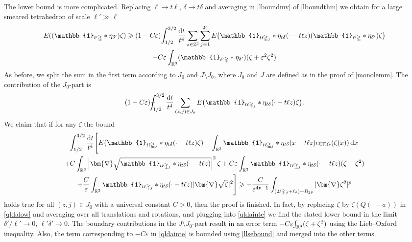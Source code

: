 \documentclass[final,onefignum,onetabnum,reqno]{amsart}
\theoremstyle{remark}
\renewcommand{\ge}{\geqslant}
\renewcommand{\epsilon}{\varepsilon}
\newcommand{\RR}{\mathbb{R}}
\newcommand{\ZZ}{\mathbb{Z}}
\newcommand{\UEG}{\mathrm{UEG}} %
\newcommand{\iden}{\mathbb{1}} %
\newcommand{\grad}{\bm{\nabla}} %
\newcommand{\tetra}{\mathbb{\Delta}} %
\newcommand{\dd}{\mathrm{d}} %
\def\Xint#1{\mathchoice
{\XXint\displaystyle\textstyle{#1}}%
{\XXint\textstyle\scriptstyle{#1}}%
{\XXint\scriptstyle\scriptscriptstyle{#1}}%
{\XXint\scriptscriptstyle\scriptscriptstyle{#1}}%
\!\int}
\def\XXint#1#2#3{{\setbox0=\hbox{$#1{#2#3}{\int}$ }
\vcenter{\hbox{$#2#3$ }}\kern-.6\wd0}}
\def\dashint{\Xint-}
\begin{document}
The lower bound is more complicated. Replacing $\ell\to t\ell$, $\delta\to t\delta$ and averaging in \cref{lboundmv} of \cref{lboundthm} we obtain for a large smeared tetrahedron of scale $\ell'\gg\ell$
\begin{multline*}
E((\iden_{\ell'\tetra}*\eta_{\delta'})\zeta)\ge \left(1-C\epsilon\right) \dashint_{1/2}^{3/2}\frac{\dd t}{t^4}\sum_{z\in\ZZ^3} \sum_{j=1}^{24} E\bigl(\iden_{t\ell\tetra_j} * \eta_{t\delta}(\cdot - t\ell z)(\iden_{\ell'\tetra}*\eta_{\delta'})\zeta\bigr)\\
 -C\epsilon \int_{\RR^3} (\iden_{\ell'\tetra}*\eta_{\delta'})(\zeta + \epsilon^2\zeta^2 )
\end{multline*}
As before, we split the sum in the first term according to $J_0$ and $J\setminus J_0$,
where $J_0$ and $J$ are defined as in the proof of \cref{monolemm}. The contribution of the $J_0$-part is
\begin{equation}\label{qldainte}
(1-C\epsilon)\dashint_{1/2}^{3/2}\frac{\dd t}{t^4} \sum_{(z,j)\in J_0}E\bigl(\iden_{t\ell\tetra_j} * \eta_{t\delta}(\cdot-t\ell z)\zeta\bigr).
\end{equation}
We claim that if for any $\zeta$ the bound
\begin{multline}\label{qldalow}
\dashint_{1/2}^{3/2}\frac{\dd t}{t^4}\Biggl[ E\bigl(\iden_{t\ell\tetra_j} * \eta_{t\delta}(\cdot-t\ell z)\zeta) - \int_{\RR^3} \iden_{t\ell\tetra_j}*\eta_{t\delta}(x-t\ell z)e_\UEG(\zeta(x))\, \dd x\\
+C\int_{\RR^3} \left|\grad\sqrt{\iden_{t\ell\tetra_j}*\eta_{t\delta}(\cdot-t\ell z)}\right|^2 \zeta 
+ C\epsilon \int_{\RR^3} \iden_{t\ell\tetra_j}*\eta_{t\delta}(\cdot-t\ell z)(\zeta+\zeta^2) \\
+\frac{C}{\epsilon} \int_{\RR^3} \iden_{t\ell\tetra_j}*\eta_{t\delta}(\cdot-t\ell z) |\grad\sqrt{\zeta}|^2 \Biggr] \ge -\frac{C}{\epsilon^{4p-1}} \int_{(2\ell\tetra_j+\ell z)+B_{2\delta}} |\grad\zeta^\theta|^p
\end{multline}
holds true for all $(z,j)\in J_0$ with a universal constant $C>0$, then the proof is finished. In fact, by replacing $\zeta$ by $\zeta(Q(\cdot-a))$ in \cref{qldalow} and averaging over all translations and rotations,
and plugging into \cref{qldainte} we find the stated lower bound in the limit $\delta'/\ell'\to 0$, $\ell'\delta'\to 0$. The boundary contributions in the $J\setminus J_0$-part result in an error term $-C\epsilon \dashint_{\RR^3} (\zeta + \zeta^2 )$ using the Lieb--Oxford inequality. 
Also, the term corresponding to $-C\epsilon$ in \cref{qldainte} is bounded using \cref{llsebound} and merged into the other terms. 
\end{document}
